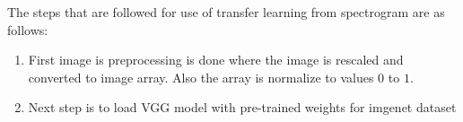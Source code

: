   The steps that are followed for use of transfer learning from spectrogram are as follows:
  \begin{enumerate}
  	\item First image is preprocessing is done where the image is rescaled and converted to image array. Also the array is normalize to values $0$ to $1$.

  	\item Next step is to load VGG model with pre-trained weights for imgenet dataset 
  \end{enumerate}
  
  
  


